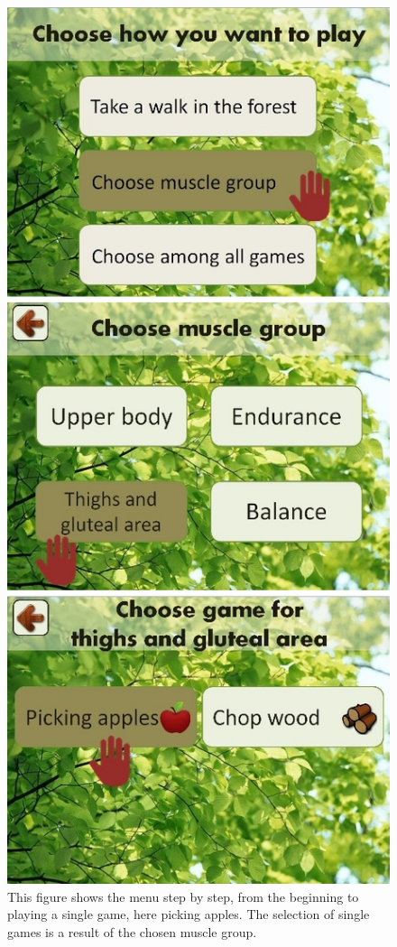 \begin{figure} [H]
\centering
\includegraphics[scale=0.45]{menuEnglishStep1.jpg}
\caption[Menu review -  part one]{This figure shows the menu step by step, from the beginning to playing a single game, here picking apples. The selection of single games is a result of the chosen muscle group.}
\label{menu1}
\end{figure}

